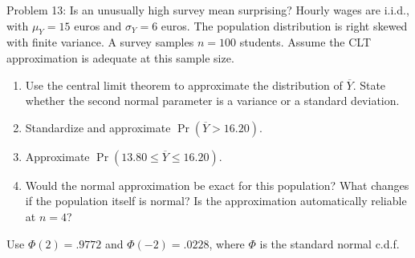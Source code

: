 \documentclass[notes,10pt, aspectratio=169]{beamer}
\newif\ifshowsolutions
\newcommand{\answerpart}[1]{\textcolor{blue}{\textbf{#1.}}\,}
\begin{document}
\begin{frame}{Problem 13: Is an unusually high survey mean surprising?}
Hourly wages are i.i.d., with $\mu_Y=15$ euros and $\sigma_Y=6$ euros. The population distribution is right skewed with finite variance. A survey samples $n=100$ students. Assume the CLT approximation is adequate at this sample size.
\begin{enumerate}
\setlength{\itemsep}{8pt}
\item Use the central limit theorem to approximate the distribution of $\overline Y$. State whether the second normal parameter is a variance or a standard deviation.
\item Standardize and approximate $\Pr(\overline Y>16.20)$.
\item Approximate $\Pr(13.80\leq\overline Y\leq16.20)$.
\item Would the normal approximation be exact for this population? What changes if the population itself is normal? Is the approximation automatically reliable at $n=4$?
\end{enumerate}
\vspace{.1cm}
Use $\Phi(2)=.9772$ and $\Phi(-2)=.0228$, where $\Phi$ is the standard normal c.d.f.
\end{frame}

\ifshowsolutions
\begin{frame}{Solution 13: A high average under the CLT}
\small
\answerpart{1}
At $n=100$, the assumed CLT approximation gives
\[
\overline Y\ \overset{a}{\sim}\ \mathcal N\left(15,\frac{36}{100}\right)
=\mathcal N(15,.36),
\qquad
Z=\frac{\overline Y-15}{.60}\ \overset{a}{\sim}\ \mathcal N(0,1).
\]
The second normal parameter is the \textbf{variance}; the SD is $.60$ euros.
\answerpart{2}
\[
\Pr(\overline Y>16.20)
\approx\Pr\left(Z>\frac{16.20-15}{.60}\right)
=1-\Phi(2)=.0228.
\]
\answerpart{3}
\[
\Pr(13.80\leq\overline Y\leq16.20)
\approx\Pr(-2\leq Z\leq2)=\Phi(2)-\Phi(-2)=.9544.
\]
\begin{itemize}
\setlength{\itemsep}{6pt}
\item \answerpart{4}For the right-skewed population these are approximate probabilities; if wages themselves are normal, the sample mean is \emph{exactly} normal at every $n$. Finite variance does not guarantee an accurate approximation at $n=4$; skewness and rare outliers affect finite-sample accuracy.
\end{itemize}
\end{frame}
\fi
\end{document}
